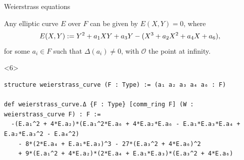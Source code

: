 \documentclass[10pt]{beamer}
\begin{document}
\begin{frame}[fragile, t]{Weierstrass equations}

\begin{theorem}
Any elliptic curve $ E $ over $ F $ can be given by $ E(X, Y) = 0 $, where \vspace{-0.2cm} $$ \vspace{-0.2cm} E(X, Y) := Y^2 + a_1XY + a_3Y - (X^3 + a_2X^2 + a_4X + a_6), $$ for some $ a_i \in F $ such that $ \Delta(a_i) \ne 0 $, with $ \mathcal{O} $ the point at infinity.
\end{theorem}



\begin{onlyenv}<6>
\begin{lstlisting}[backgroundcolor=\color{lime}, basicstyle=\scriptsize, frame=single]
structure weierstrass_curve (F : Type) := (a₁ a₂ a₃ a₄ a₆ : F)

def weierstrass_curve.Δ {F : Type} [comm_ring F] (W : weierstrass_curve F) : F :=
  -(E.a₁^2 + 4*E.a₂)*(E.a₁^2*E.a₆ + 4*E.a₂*E.a₆ - E.a₁*E.a₃*E.a₄ + E.a₂*E.a₃^2 - E.a₄^2)
    - 8*(2*E.a₄ + E.a₁*E.a₃)^3 - 27*(E.a₃^2 + 4*E.a₆)^2
    + 9*(E.a₁^2 + 4*E.a₂)*(2*E.a₄ + E.a₁*E.a₃)*(E.a₃^2 + 4*E.a₆)


\end{lstlisting}
\end{onlyenv}
\end{frame}
\end{document}
